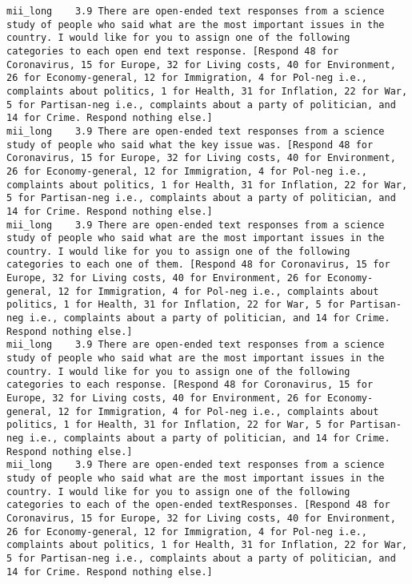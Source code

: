 \begin{lstlisting}[label=lst:promptvariants]
mii_long	3.9	There are open-ended text responses from a science study of people who said what are the most important issues in the country. I would like for you to assign one of the following categories to each open end text response. [Respond 48 for Coronavirus, 15 for Europe, 32 for Living costs, 40 for Environment, 26 for Economy-general, 12 for Immigration, 4 for Pol-neg i.e., complaints about politics, 1 for Health, 31 for Inflation, 22 for War, 5 for Partisan-neg i.e., complaints about a party of politician, and 14 for Crime. Respond nothing else.]
mii_long	3.9	There are open-ended text responses from a science study of people who said what the key issue was. [Respond 48 for Coronavirus, 15 for Europe, 32 for Living costs, 40 for Environment, 26 for Economy-general, 12 for Immigration, 4 for Pol-neg i.e., complaints about politics, 1 for Health, 31 for Inflation, 22 for War, 5 for Partisan-neg i.e., complaints about a party of politician, and 14 for Crime. Respond nothing else.]
mii_long	3.9	There are open-ended text responses from a science study of people who said what are the most important issues in the country. I would like for you to assign one of the following categories to each one of them. [Respond 48 for Coronavirus, 15 for Europe, 32 for Living costs, 40 for Environment, 26 for Economy-general, 12 for Immigration, 4 for Pol-neg i.e., complaints about politics, 1 for Health, 31 for Inflation, 22 for War, 5 for Partisan-neg i.e., complaints about a party of politician, and 14 for Crime. Respond nothing else.]
mii_long	3.9	There are open-ended text responses from a science study of people who said what are the most important issues in the country. I would like for you to assign one of the following categories to each response. [Respond 48 for Coronavirus, 15 for Europe, 32 for Living costs, 40 for Environment, 26 for Economy-general, 12 for Immigration, 4 for Pol-neg i.e., complaints about politics, 1 for Health, 31 for Inflation, 22 for War, 5 for Partisan-neg i.e., complaints about a party of politician, and 14 for Crime. Respond nothing else.]
mii_long	3.9	There are open-ended text responses from a science study of people who said what are the most important issues in the country. I would like for you to assign one of the following categories to each of the open-ended textResponses. [Respond 48 for Coronavirus, 15 for Europe, 32 for Living costs, 40 for Environment, 26 for Economy-general, 12 for Immigration, 4 for Pol-neg i.e., complaints about politics, 1 for Health, 31 for Inflation, 22 for War, 5 for Partisan-neg i.e., complaints about a party of politician, and 14 for Crime. Respond nothing else.]

\end{lstlisting}
